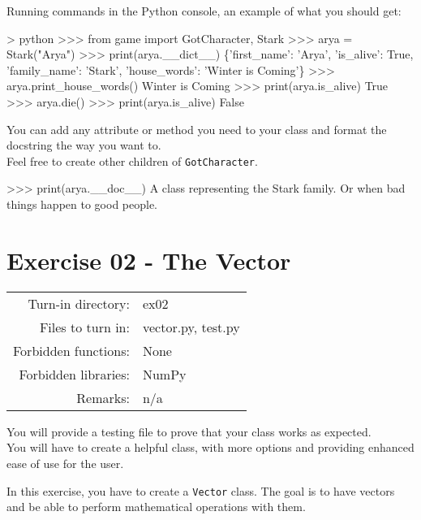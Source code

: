 \documentclass[]{article}
\newenvironment{Shaded}{\begin{snugshade}}{\end{snugshade}}
\newcommand{\NormalTok}[1]{\textcolor[rgb]{0.81,0.81,0.76}{#1}}
\begin{document}
Running commands in the Python console, an example of what you should
get:

\begin{Shaded}
\begin{Highlighting}[]
\NormalTok{> python}
\NormalTok{>>> from game import GotCharacter, Stark}
\NormalTok{>>> arya = Stark("Arya")}
\NormalTok{>>> print(arya.__dict__)}
\NormalTok{\{'first_name': 'Arya', 'is_alive': True, 'family_name': 'Stark', 'house_words': 'Winter is Coming'\}}
\NormalTok{>>> arya.print_house_words()}
\NormalTok{Winter is Coming}
\NormalTok{>>> print(arya.is_alive)}
\NormalTok{True}
\NormalTok{>>> arya.die()}
\NormalTok{>>> print(arya.is_alive)}
\NormalTok{False}
\end{Highlighting}
\end{Shaded}

You can add any attribute or method you need to your class and format
the docstring the way you want to.\\
Feel free to create other children of \texttt{GotCharacter}.

\begin{Shaded}
\begin{Highlighting}[]
\NormalTok{>>> print(arya.__doc__)}
\NormalTok{A class representing the Stark family. Or when bad things happen to good people.}
\end{Highlighting}
\end{Shaded}

\clearpage

\hypertarget{exercise-02---the-vector-1}{%
\section{Exercise 02 - The Vector}\label{exercise-02---the-vector-1}}

\begin{longtable}[]{@{}rl@{}}
\toprule
\endhead
Turn-in directory: & ex02\tabularnewline
Files to turn in: & vector.py, test.py\tabularnewline
Forbidden functions: & None\tabularnewline
Forbidden libraries: & NumPy\tabularnewline
Remarks: & n/a\tabularnewline
\bottomrule
\end{longtable}

You will provide a testing file to prove that your class works as
expected.\\
You will have to create a helpful class, with more options and providing
enhanced ease of use for the user.

In this exercise, you have to create a \texttt{Vector} class. The goal
is to have vectors and be able to perform mathematical operations with
them.
\end{document}
